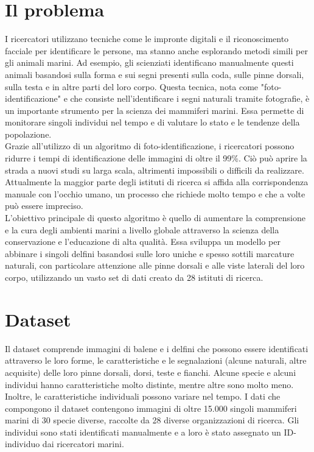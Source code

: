 \documentclass[a4paper,final,12pt]{report}
\begin{document}
\section{Il problema}
I ricercatori utilizzano tecniche come le impronte digitali e il riconoscimento facciale per identificare le persone, ma stanno anche esplorando metodi simili per gli animali marini. Ad esempio, gli scienziati identificano manualmente questi animali basandosi sulla forma e sui segni presenti sulla coda, sulle pinne dorsali, sulla testa e in altre parti del loro corpo. Questa tecnica, nota come "foto-identificazione" e che consiste nell'identificare i segni naturali tramite fotografie, è un importante strumento per la scienza dei mammiferi marini. Essa permette di monitorare singoli individui nel tempo e di valutare lo stato e le tendenze della popolazione.\\

Grazie all'utilizzo di un algoritmo di foto-identificazione, i ricercatori possono ridurre i tempi di identificazione delle immagini di oltre il 99\%. Ciò può aprire la strada a nuovi studi su larga scala, altrimenti impossibili o difficili da realizzare. Attualmente la maggior parte degli istituti di ricerca si affida alla corrispondenza manuale con l'occhio umano, un processo che richiede molto tempo e che a volte può essere impreciso.\\

L'obiettivo principale di questo algoritmo è quello di aumentare la comprensione e la cura degli ambienti marini a livello globale attraverso la scienza della conservazione e l'educazione di alta qualità. Essa sviluppa un modello per abbinare i singoli delfini basandosi sulle loro uniche e spesso sottili marcature naturali, con particolare attenzione alle pinne dorsali e alle viste laterali del loro corpo, utilizzando un vasto set di dati creato da 28 istituti di ricerca.\\

\section{Dataset}
Il dataset comprende immagini di  balene e i delfini che possono essere identificati attraverso le loro forme, le caratteristiche e le segnalazioni (alcune naturali, altre acquisite) delle loro pinne dorsali, dorsi, teste e fianchi. Alcune specie e alcuni individui hanno caratteristiche molto distinte, mentre altre sono molto meno. Inoltre, le caratteristiche individuali possono variare nel tempo. I dati che compongono il dataset contengono immagini di oltre 15.000 singoli mammiferi marini di 30 specie diverse, raccolte da 28 diverse organizzazioni di ricerca. Gli individui sono stati identificati manualmente e a loro è stato assegnato un ID-individuo dai ricercatori marini.
\end{document}
